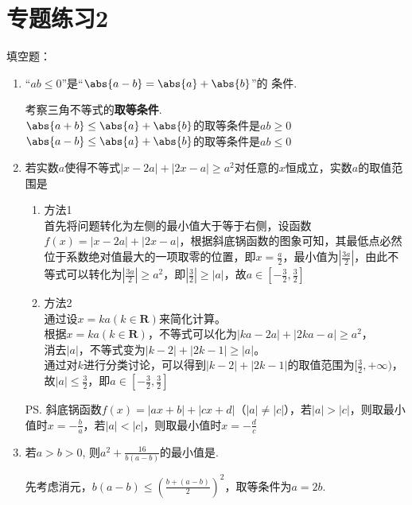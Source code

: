 \chapter*{专题练习2}
填空题：
\begin{enumerate}
    \item ``$ab \leq 0$''是``$\abs{a-b}=\abs{a}+\abs{b}$''的 条件.
    \begin{jieda}
    考察三角不等式的\textbf{取等条件}. \\
    $\abs{a+b} \leq \abs{a}+\abs{b}$的取等条件是$ab\geq 0$ \\
    $\abs{a-b} \leq \abs{a}+\abs{b}$的取等条件是$ab\leq 0$
    \end{jieda}
    \item 若实数$a$使得不等式$|x-2a| + |2x-a| \geq a^2$对任意的$x$恒成立，实数$a$的取值范围是
    \begin{jieda}
        \begin{enumerate}
        \item 方法1 \\
        首先将问题转化为左侧的最小值大于等于右侧，设函数$f(x) = |x-2a| + |2x-a|$，根据斜底锅函数的图象可知，其最低点必然位于系数绝对值最大的一项取零的位置，即$x = \frac{a}{2}$，最小值为$|\frac{3a}{2}|$，由此不等式可以转化为$|\frac{3a}{2}| \geq a^2$，即$|\frac{3}{2}| \geq |a|$，故$a \in [-\frac{3}{2}, \frac{3}{2}]$
        \item 方法2 \\
        通过设$x = ka(k \in \mathbf{R})$来简化计算。\\
        根据$x = ka(k \in \mathbf{R})$，不等式可以化为$|ka - 2a| + |2ka - a| \geq a^2$，\\
        消去$|a|$，不等式变为$|k - 2| + |2k - 1| \geq |a|$。\\
        通过对$k$进行分类讨论，可以得到$|k - 2| + |2k - 1|$的取值范围为$[\frac{3}{2}, +\infty)$，故$|a| \leq \frac{3}{2}$，即$a \in [-\frac{3}{2}, \frac{3}{2}]$
        \end{enumerate}
        \ps 斜底锅函数$f(x) = |ax+b|+|cx+d|$（$|a| \neq |c|$），若$|a| > |c|$，则取最小值时$x = -\frac{b}{a}$，若$|a| < |c|$，则取最小值时$x = -\frac{d}{c}$
    \end{jieda}
    \item 若$a>b>0$, 则$a^2+\frac{16}{b(a-b)}$的最小值是. 
    \begin{jieda}
    先考虑消元，$b(a-b) \leq \left (\frac{b+(a-b)}{2}\right )^2$，取等条件为$a = 2b$. \\

\end{jieda}
\end{enumerate}
